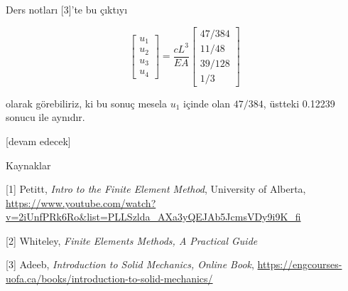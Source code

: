 \documentclass[12pt,fleqn]{article}\usepackage{../../common}
\begin{document}
Ders notları [3]'te bu çıktıyı

$$
\left[\begin{array}{c}
u_1 \\ u_2 \\ u_3 \\ u_4 
\end{array}\right] =
\frac{cL^3}{EA}
\left[\begin{array}{c}
47/384 \\ 11/48 \\ 39/128 \\ 1/3
\end{array}\right]
$$

olarak görebiliriz, ki bu sonuç mesela $u_1$ içinde olan $47/384$, üstteki
0.12239 sonucu ile aynıdır.

[devam edecek]

Kaynaklar

[1] Petitt, {\em Intro to the Finite Element Method}, University of Alberta,
    \url{https://www.youtube.com/watch?v=2iUnfPRk6Ro&list=PLLSzlda_AXa3yQEJAb5JcmsVDy9i9K_fi}

[2] Whiteley, {\em Finite Elements Methods, A Practical Guide}
    
[3] Adeeb, {\em Introduction to Solid Mechanics, Online Book},
    \url{https://engcourses-uofa.ca/books/introduction-to-solid-mechanics/}
\end{document}
